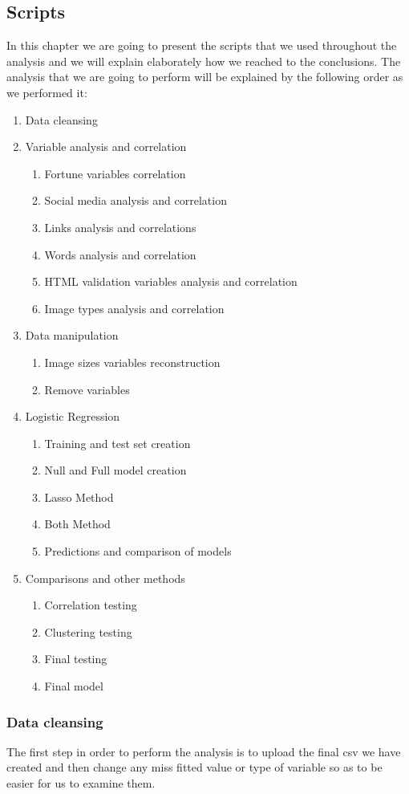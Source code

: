 \documentclass{article}
\begin{document}
\subsection{Scripts}
In this chapter we are going to present the scripts that we used throughout the analysis and we will explain elaborately how we reached to the conclusions. The analysis that we are going to perform will be explained by the following order as we performed it:
\begin{enumerate}
\item Data cleansing
\item Variable analysis and correlation
\begin{enumerate}
\item Fortune variables correlation
\item Social media analysis and correlation
\item Links analysis and correlations
\item Words analysis and correlation
\item HTML validation variables analysis and correlation
\item Image types analysis and correlation
\end{enumerate}
\item Data manipulation
\begin{enumerate}
\item Image sizes variables reconstruction
\item Remove variables
\end{enumerate}
\item Logistic Regression
\begin{enumerate}
\item Training and test set creation
\item Null and Full model creation
\item Lasso Method
\item Both Method
\item Predictions and comparison of models
\end{enumerate}
\item Comparisons and other methods
\begin{enumerate}
\item Correlation testing
\item Clustering testing
\item Final testing
\item Final model
\end{enumerate}
\end{enumerate}
\subsubsection{Data cleansing}
The first step in order to perform the analysis is to upload the final csv we have created and then change any miss fitted value or type of variable so as to be easier for us to examine them.
\end{document}
